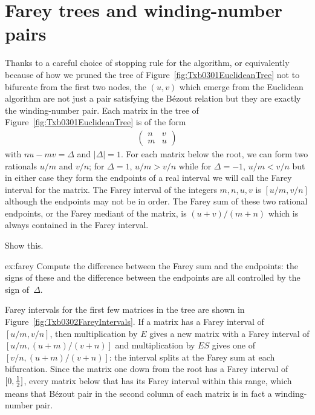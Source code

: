 \section{Farey trees and winding-number pairs}

Thanks to a careful choice of stopping rule for the algorithm, or equivalently because of how we pruned the tree of Figure~\ref{fig:Txb0301EuclideanTree} not to bifurcate from the first two nodes, the $(u,v)$ which emerge from the Euclidean algorithm are not just a pair satisfying the B\'ezout relation but they are exactly the winding-number pair.
%
Each matrix in the tree of Figure~\ref{fig:Txb0301EuclideanTree} is of the form
\begin{align*}
	\begin{pmatrix} 
		n & v
		\\
		m & u
	\end{pmatrix}
\end{align*}
with $nu-mv=\Delta$ and $|\Delta|=1$. For each matrix below the root, we can form two rationals $u/m$ and $v/n$; for  $\Delta=1$, $u/m>v/n$ while for $\Delta=-1$, $u/m<v/n$ but in either case they form the endpoints of a real interval we will call the Farey interval for the matrix. 
The Farey interval of the integers $m, n, u, v$ is $[u/m,v/n]$ although the endpoints may not be in order. 
The Farey sum of these two rational endpoints, or the Farey mediant of the matrix, is $(u+v)/(m+n)$ which is always contained in the Farey interval.
\begin{jExercise}\label{ex:farey}
	Show this.
\end{jExercise}
\begin{jAnswer}{ex:farey}
	Compute the difference between the Farey sum and the endpoints: the signs of these and the difference between the endpoints are all controlled by the sign of~$\Delta$. 
\end{jAnswer}

Farey intervals for the first few matrices in the tree are shown in Figure~\ref{fig:Txb0302FareyIntervals}.%
%
%
If a matrix has a Farey interval of  $[u/m,v/n]$, then multiplication by $E$ gives a new matrix with a Farey interval of $[u/m,(u+m)/(v+n)]$ and multiplication by $ES$ gives one of  $[v/n,(u+m)/(v+n)]$: the interval splits at the Farey sum at each bifurcation. Since the matrix one down from the root has a Farey interval of $[0,\textstyle{\frac{1}{2}}]$, every matrix below that has its Farey interval within this range, which means that  B\'ezout pair in the second column of each matrix is in fact a winding-number pair.

